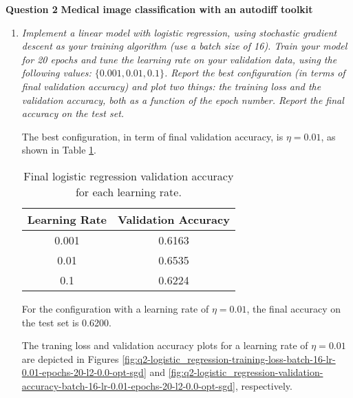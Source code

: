 \documentclass[12pt]{article}
\begin{document}
\vspace{12pt}

\center\large{\textbf{Question 2}}
\center\textbf{Medical image classification with an autodiff toolkit}

\begin{enumerate}[leftmargin=\labelsep]
    \item \textit{Implement a linear model with logistic regression, using stochastic gradient descent as your training algorithm (use a batch size of 16). Train your model for 20 epochs and tune the learning rate on your validation data, using the following values: $\{0.001, 0.01, 0.1\}$.  Report the best configuration (in terms of final validation accuracy) and plot two things: the training loss and the validation accuracy, both as a function of the epoch number. Report the final accuracy on the test set.}

          \vspace{12pt}

          The best configuration, in term of final validation accuracy, is $\eta = 0.01$, as shown in Table \ref{tab:logistic_regression-20}.

          \begin{table}[H]
              \centering
              \begin{tabular}{|c|c|}
                  \hline
                  \textbf{Learning Rate} & \textbf{Validation Accuracy} \\ \hline
                  0.001                  & 0.6163                       \\ \hline
                  0.01                   & 0.6535                       \\ \hline
                  0.1                    & 0.6224                       \\ \hline
              \end{tabular}
              \caption{Final logistic regression validation accuracy for each learning rate.}
              \label{tab:logistic_regression-20}
          \end{table}

          For the configuration with a learning rate of $\eta = 0.01$, the final accuracy on the test set is 0.6200.

          \vspace{12pt}

          The traning loss and validation accuracy plots for a learning rate of $\eta = 0.01$ are depicted in Figures \ref{fig:q2-logistic_regression-training-loss-batch-16-lr-0.01-epochs-20-l2-0.0-opt-sgd} and \ref{fig:q2-logistic_regression-validation-accuracy-batch-16-lr-0.01-epochs-20-l2-0.0-opt-sgd}, respectively.


\end{enumerate}
\end{document}
